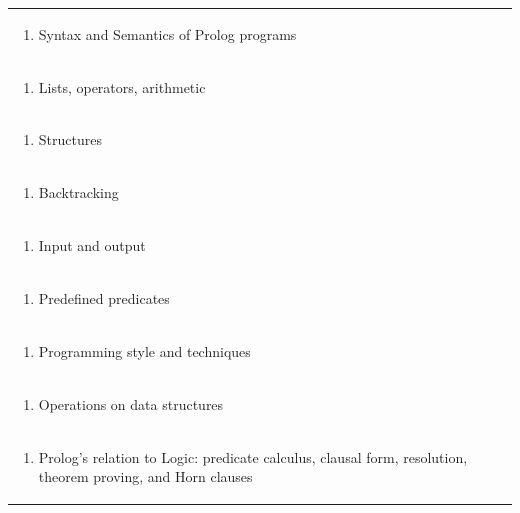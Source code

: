 \documentclass[11pt]{article}
\begin{document}
\begin{center}
\begin{longtable}{|p{4cm}|p{4cm}|p{4cm}|p{4cm}|}
\multicolumn{4}{|p{\dimexpr 16cm + 6\tabcolsep\relax}|}{\begin{enumerate}[start=3]\item Syntax and Semantics of Prolog programs\end{enumerate}}\\
\multicolumn{4}{|p{\dimexpr 16cm + 6\tabcolsep\relax}|}{\begin{enumerate}[start=4]\item Lists, operators, arithmetic\end{enumerate}}\\
\multicolumn{4}{|p{\dimexpr 16cm + 6\tabcolsep\relax}|}{\begin{enumerate}[start=5]\item Structures\end{enumerate}}\\
\multicolumn{4}{|p{\dimexpr 16cm + 6\tabcolsep\relax}|}{\begin{enumerate}[start=6]\item Backtracking\end{enumerate}}\\
\multicolumn{4}{|p{\dimexpr 16cm + 6\tabcolsep\relax}|}{\begin{enumerate}[start=7]\item Input and output\end{enumerate}}\\
\multicolumn{4}{|p{\dimexpr 16cm + 6\tabcolsep\relax}|}{\begin{enumerate}[start=8]\item Predefined predicates\end{enumerate}}\\
\multicolumn{4}{|p{\dimexpr 16cm + 6\tabcolsep\relax}|}{\begin{enumerate}[start=9]\item Programming style and techniques\end{enumerate}}\\
\multicolumn{4}{|p{\dimexpr 16cm + 6\tabcolsep\relax}|}{\begin{enumerate}[start=10]\item Operations on data structures\end{enumerate}}\\
\multicolumn{4}{|p{\dimexpr 16cm + 6\tabcolsep\relax}|}{\begin{enumerate}[start=11]\item Prolog's relation to Logic: predicate calculus, clausal form, resolution, theorem proving, and Horn clauses\end{enumerate}}\\

\end{longtable}
\end{center}
\end{document}
